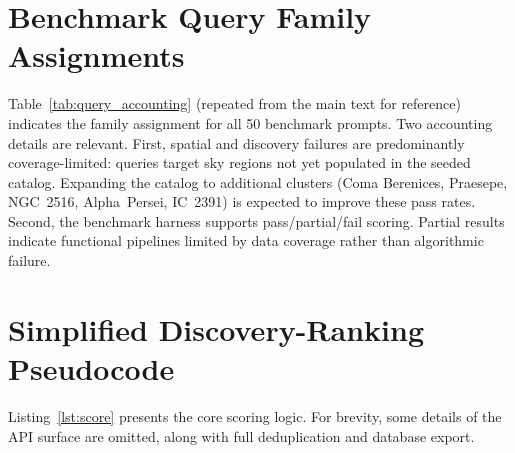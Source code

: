 \documentclass[preprint,12pt,authoryear]{elsarticle}
\begin{document}
\section{Benchmark Query Family Assignments}
\label{app:benchmark}

Table~\ref{tab:query_accounting} (repeated from the main text for reference) indicates the family assignment for all
50 benchmark prompts. Two accounting details are relevant. First, spatial and discovery failures are predominantly coverage-limited: queries target sky regions not yet populated in the seeded catalog. Expanding the catalog to additional clusters (Coma Berenices, Praesepe, NGC~2516, Alpha~Persei, IC~2391) is expected to improve these pass rates. Second, the benchmark harness supports pass/partial/fail scoring. Partial results indicate functional pipelines limited by data coverage rather than algorithmic failure.

\section{Simplified Discovery-Ranking Pseudocode}
\label{app:scoring}

Listing~\ref{lst:score} presents the core scoring logic. For brevity, some details of the API surface are omitted, along with full deduplication and database export.
\end{document}
